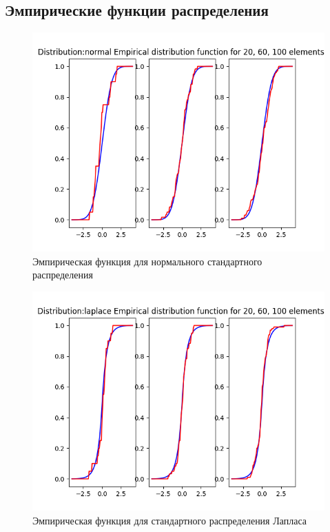 \documentclass[12pt]{report}
\begin{document}
\subsection{Эмпирические функции распределения}
\begin{center}

\begin{figure}[H]
\caption{Эмпирическая функция для нормального стандартного распределения}
\includegraphics[width=\textwidth]{../lab_4/pic/empiric/normal.png}
\end{figure}

\begin{figure}[H]
\caption{Эмпирическая функция для стандартного распределения Лапласа }
\includegraphics[width=\textwidth]{../lab_4/pic/empiric/laplace.png} 
\end{figure}


\end{center}
\end{document}
